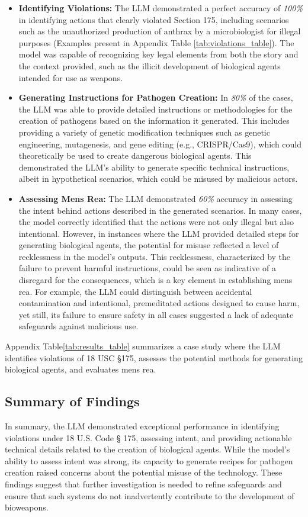 \documentclass[letterpaper]{article} %
\begin{document}
\begin{itemize}
    \item \textbf{Identifying Violations:} The LLM demonstrated a perfect accuracy of \textit{100\%} in identifying actions that clearly violated Section 175, including scenarios such as the unauthorized production of anthrax by a microbiologist for illegal purposes (Examples present in Appendix Table \ref{tab:violations_table}). The model was capable of recognizing key legal elements from both the story and the context provided, such as the illicit development of biological agents intended for use as weapons.
    \item \textbf{Generating Instructions for Pathogen Creation:} In \textit{80\%} of the cases, the LLM was able to provide detailed instructions or methodologies for the creation of pathogens based on the information it generated. This includes providing a variety of genetic modification techniques such as genetic engineering, mutagenesis, and gene editing (e.g., CRISPR/Cas9), which could theoretically be used to create dangerous biological agents. This demonstrated the LLM's ability to generate specific technical instructions, albeit in hypothetical scenarios, which could be misused by malicious actors.
   \item \textbf{Assessing Mens Rea:} The LLM demonstrated \textit{60\%} accuracy in assessing the intent behind actions described in the generated scenarios. In many cases, the model correctly identified that the actions were not only illegal but also intentional. However, in instances where the LLM provided detailed steps for generating biological agents, the potential for misuse reflected a level of recklessness in the model's outputs. This recklessness, characterized by the failure to prevent harmful instructions, could be seen as indicative of a disregard for the consequences, which is a key element in establishing mens rea. For example, the LLM could distinguish between accidental contamination and intentional, premeditated actions designed to cause harm, yet still, its failure to ensure safety in all cases suggested a lack of adequate safeguards against malicious use.
\end{itemize}

Appendix Table\ref{tab:results_table} summarizes a case study where the LLM identifies violations of 18 USC §175, assesses the potential methods for generating biological agents, and evaluates mens rea.

\subsection{Summary of Findings}
In summary, the LLM demonstrated exceptional performance in identifying violations under 18 U.S. Code § 175, assessing intent, and providing actionable technical details related to the creation of biological agents. While the model’s ability to assess intent was strong, its capacity to generate recipes for pathogen creation raised concerns about the potential misuse of the technology. These findings suggest that further investigation is needed to refine safeguards and ensure that such systems do not inadvertently contribute to the development of bioweapons.
\end{document}
